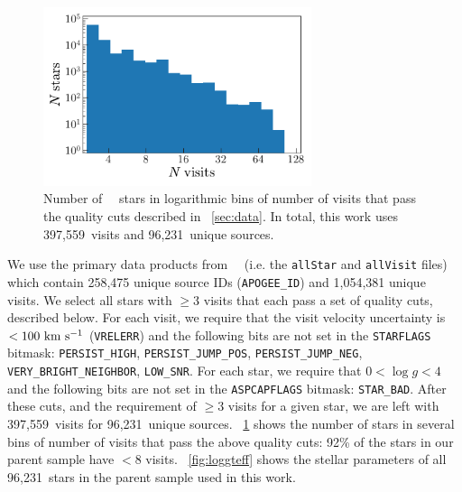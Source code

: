 \documentclass[modern, letterpaper]{aastex62}
\newcommand{\apogee}{\project{\acronym{APOGEE}}}
\newcommand{\DR}{\acronym{DR14}}
\newcommand{\logg}{\ensuremath{\log g}}
\newcommand{\nstars}{96,231}
\newcommand{\nvisits}{397,559}
\begin{document}
\begin{figure}[h]
\begin{center}
\includegraphics[width=0.7\textwidth]{nvisits.pdf}
\end{center}
\caption{%
Number of \apogee\ \DR\ stars in logarithmic bins of number of visits that pass
the quality cuts described in \sectionname~\ref{sec:data}.
In total, this work uses \nvisits\ visits and \nstars\ unique sources.
\label{fig:nvisits}
}
\end{figure}

We use the primary data products from \apogee\ \DR\ (i.e. the \texttt{allStar}
and \texttt{allVisit} files) which contain 258,475 unique source IDs
(\texttt{APOGEE\_ID}) and 1,054,381 unique visits.
We select all stars with $\geq 3$ visits that each pass a set of quality cuts,
described below.
For each visit, we require that the visit velocity uncertainty is $< 100~\mathrm{km}~\mathrm{s}^{-1}$
(\texttt{VRELERR}) and the following bits are not set in the \texttt{STARFLAGS}
bitmask: \texttt{PERSIST\_HIGH}, \texttt{PERSIST\_JUMP\_POS},
\texttt{PERSIST\_JUMP\_NEG}, \texttt{VERY\_BRIGHT\_NEIGHBOR}, \texttt{LOW\_SNR}.
For each star, we require that $0 < \logg < 4$ and the following bits are not
set in the \texttt{ASPCAPFLAGS} bitmask: \texttt{STAR\_BAD}.
After these cuts, and the requirement of $\geq 3$ visits for a given star, we
are left with \nvisits\ visits for \nstars\ unique sources.
\figurename~\ref{fig:nvisits} shows the number of stars in several bins of
number of visits that pass the above quality cuts: 92\% of the stars in
our parent sample have $< 8$ visits.
\figurename~\ref{fig:loggteff} shows the stellar parameters of all \nstars\
stars in the parent sample used in this work.
\end{document}
